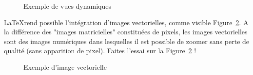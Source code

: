 \documentclass[a4paper,12pt]{report}
\begin{document}
\begin{figure}[hbtp]
\begin{center}


\end{center}  
\caption{Exemple de vues dynamiques
\label{figure_modele_dynamique}} 
\end{figure}


\newpage
\FloatBarrier
\LaTeX rend possible l'intégration d'images vectorielles, comme visible Figure~\ref{figure_vectorielle}. A la différence des "images matricielles" constituées de pixels, les images vectorielles sont des images numériques dans lesquelles il est possible de zoomer sans perte de qualité (sans apparition de pixel). Faites l'essai sur la Figure~\ref{figure_vectorielle} !

\begin{figure}[hbtp]
	\centering
	\def\svgwidth{1\columnwidth}
	\fontsize{10pt}{10pt}\selectfont
	\caption{Exemple d'image vectorielle}
	\label{figure_vectorielle}
\end{figure}



\FloatBarrier
\newpage





\end{document}
